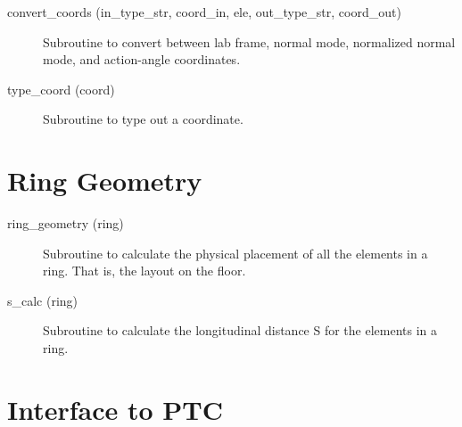 \begin{description}

\item[convert\_coords (in\_type\_str, coord\_in, ele, out\_type\_str, coord\_out)] \Newline
Subroutine to convert between lab frame, normal mode, normalized normal mode, and action-angle coordinates. 

\item[type\_coord (coord)] \Newline
Subroutine to type out a coordinate. 

\end{description}

\section{Ring Geometry}
\label{r:geom}     

\begin{description}

\item[ring\_geometry (ring)] \Newline
Subroutine to calculate the physical placement of all the elements in a ring. That is, the layout on the floor. 

\item[s\_calc (ring)] \Newline
Subroutine to calculate the longitudinal distance S for the elements in a ring. 

\end{description}

\section{Interface to PTC}
\label{r:ptc}      

